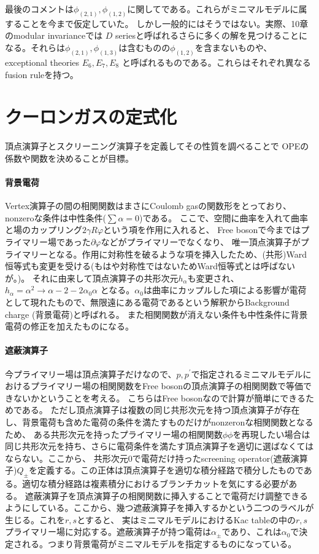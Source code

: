 \documentclass[11pt, aps, longbibliography]{article}
\numberwithin{equation}{section}
\begin{document}
        最後のコメントは$\phi_{(2,1)},\phi_{(1,2)}$に関してである。これらがミニマルモデルに属することを今まで仮定していた。
        しかし一般的にはそうではない。実際、10章のmodular invarianceでは
        $D$ seriesと呼ばれるさらに多くの解を見つけることになる。それらは$\phi_{(2,1)},\phi_{(1,3)}$は含むものの$\phi_{(1,2)}$を含まないものや、
        exceptional theories $E_6,E_7,E_8$ と呼ばれるものである。これらはそれぞれ異なるfusion ruleを持つ。

    \section{クーロンガスの定式化}
    頂点演算子とスクリーニング演算子を定義してその性質を調べることで
    OPEの係数や関数を決めることが目標。
    
    \paragraph{背景電荷}
    Vertex演算子の間の相関関数はまさにCoulomb gasの関数形をとっており、nonzeroな条件は中性条件($\sum \alpha=0$)である。
    ここで、空間に曲率を入れて曲率と場のカップリング$2\gamma R\varphi$という項を作用に入れると、
    Free bosonで今まではプライマリー場であった$\partial \varphi$などがプライマリーでなくなり、
    唯一頂点演算子がプライマリーとなる。作用に対称性を破るような項を挿入したため、(共形)Ward恒等式も変更を受ける(もはや対称性ではないためWard恒等式とは呼ばないが。)。
    それに由来して頂点演算子の共形次元$h_\alpha$も変更され、$h_\alpha =\alpha^2 \rightarrow \alpha-2 - 2\alpha_0\alpha$
    となる。$\alpha_0$は曲率にカップルした項による影響が電荷として現れたもので、無限遠にある電荷であるという解釈からBackground charge (背景電荷)と呼ばれる。
    また相関関数が消えない条件も中性条件に背景電荷の修正を加えたものになる。
    
    \paragraph{遮蔽演算子}
    今プライマリー場は頂点演算子だけなので、$p,p^\prime$で指定されるミニマルモデルにおけるプライマリー場の相関関数をFree bosonの頂点演算子の相関関数で等価できないかということを考える。
    こちらはFree bosonなので計算が簡単にできるためである。
    ただし頂点演算子は複数の同じ共形次元を持つ頂点演算子が存在し、背景電荷も含めた電荷の条件を満たすものだけがnonzeronな相関関数となるため、
    ある共形次元を持ったプライマリー場の相関関数$\phi\phi$を再現したい場合は同じ共形次元を持ち、さらに電荷条件を満たす頂点演算子を適切に選ばなくてはならない。ここから、
    共形次元0で電荷だけ持ったscreening operator(遮蔽演算子)$Q_{\pm}$を定義する。この正体は頂点演算子を適切な積分経路で積分したものである。適切な積分経路は複素積分におけるブランチカットを気にする必要がある。
    遮蔽演算子を頂点演算子の相関関数に挿入することで電荷だけ調整できるようにしている。ここから、幾つ遮蔽演算子を挿入するかという二つのラベルが生じる。これを$r,s$とすると、
    実はミニマルモデルにおけるKac tableの中の$r,s$プライマリー場に対応する。遮蔽演算子が持つ電荷は$\alpha_\pm$であり、これは$\alpha_0$で決定される。つまり背景電荷がミニマルモデルを指定するものになっている。
\end{document}
